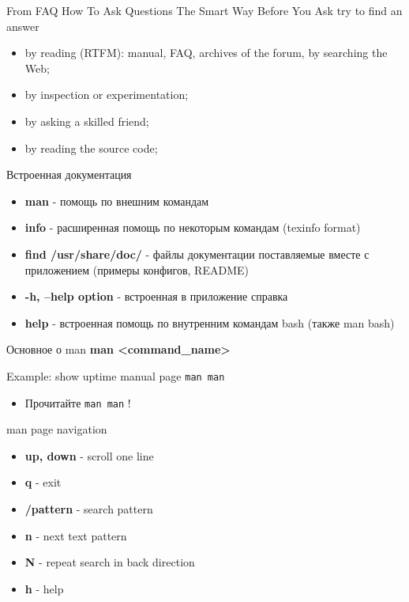 \begin{frame}[fragile]{From FAQ How To Ask Questions The Smart Way}
Before You Ask try to find an answer
  \begin{itemize}
	  \item by reading (RTFM): manual, FAQ, archives of the forum, by searching the Web;
	  \item by inspection or experimentation;
	  \item by asking a skilled friend;
	  \item by reading the source code;
    \end{itemize}
\end{frame}


\begin{frame}[fragile]{Встроенная документация}
\begin{itemize}
    \item \textbf{man} - помощь по внешним командам
    \pause
    \item \textbf{info} - расширенная помощь по некоторым командам (texinfo format)
    \pause
    \item \textbf{find /usr/share/doc/} - файлы документации поставляемые вместе с приложением (примеры конфигов, README)
    \item \textbf{-h, --help option} - встроенная в приложение справка
    \item \textbf{help} - встроенная помощь по внутренним командам bash (также man bash)
\end{itemize}
\end{frame}

\begin{frame}[fragile]{Основное о man}
      \textbf{man \textless command\_name\textgreater }

	\begin{block}{Example: show uptime manual page}
		{\tt man man}
	\end{block}

		\begin{itemize}
			\item Прочитайте {\tt man man} !
		\end{itemize}

\end{frame}

\begin{frame}[fragile]{man page navigation}
		\begin{itemize}
			\item \textbf{up, down} - scroll one line
			\item \textbf{q} - exit
			\item \textbf{/pattern} - search pattern
			\item \textbf{n} - next text pattern
			\item \textbf{N} - repeat search in back direction
			\item \textbf{h} - help
		\end{itemize}
\end{frame}

